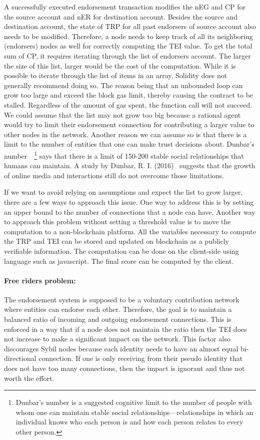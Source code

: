 A successfully executed endorsement transaction modifies the \ac{nEG} and
\ac{CP} for the source account and \ac{nER} for destination account. Besides
the source and destination account, the state of \ac{TRP} for all past
endorsers of source account also needs to be modified. Therefore, a node needs
to keep track of all its neighboring (endorsers) nodes as well for correctly
computing the \ac{TEI} value. To get the total sum of \ac{CP}, it requires
iterating through the list of endorsers account. The larger the size of this
list, larger would be the cost of the computation. While it is possible to
iterate through the list of items in an array, Solidity does not generally
recommend doing so. The reason being that an unbounded loop can grow too large
and exceed the block gas limit, thereby causing the contract to be stalled.
Regardless of the amount of gas spent, the function call will not succeed. We
could assume that the list may not grow too big because a rational agent would
try to limit their endorsement connection for contributing a larger value to
other nodes in the network. Another reason we can assume so is that there is a
limit to the number of entities that one can make trust decisions about.
Dunbar's number~\cite{hill2003social}~\footnote{Dunbar's number is a suggested
cognitive limit to the number of people with whom one can maintain stable
social relationships—relationships in which an individual knows who each person
is and how each person relates to every other person.} says that there is a
limit of 150-200 stable social relationships that humans can maintain. A study
by Dunbar, R. I. (2016)~\cite{dunbar2016online} suggests that the growth of
online media and interactions still do not overcome those limitations. \par 
If we want to avoid relying on assumptions and expect the list to grow larger,
there are a few ways to approach this issue. One way to address this is by
setting an upper bound to the number of connections that a node can have.
Another way to approach this problem without setting a threshold value is to
move the computation to a non-blockchain platform. All the variables necessary
to compute the \ac{TRP} and \ac{TEI} can be stored and updated on blockchain as
a publicly verifiable information. The computation can be done on the
client-side using language such as javascript. The final score can be computed
by the client.  
\paragraph{Free riders problem:} The endorsement system is supposed to be a
voluntary contribution network where entities can endorse each other.
Therefore, the goal is to maintain a balanced ratio of incoming and outgoing
endorsement connections. This is enforced in a way that if a node does not
maintain the ratio then the \ac{TEI} does not increase to make a significant
impact on the network. This factor also discourages Sybil nodes because each
identity needs to have an almost equal bi-directional connection. If one is
only receiving from their pseudo identity that does not have too many
connections, then the impact is ignorant and thus not worth the effort.
